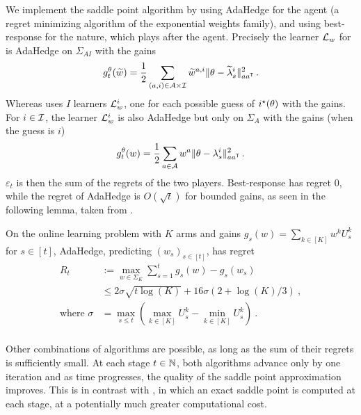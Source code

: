We implement the saddle point algorithm by using AdaHedge for the agent (a regret minimizing algorithm of the exponential weights family), and using best-response for the nature, which plays after the agent. Precisely the learner $\mathcal{L}_w$ for \LGC is AdaHedge on $\Sigma_{AI}$ with the gains
\[
g_t^\theta(\widetilde{w}) = \frac{1}{2} \sum_{(a,i)\in\mathcal{A}\times\mathcal{I}}  \widetilde{w}^{a,i} \Vert \theta - \widetilde{\lambda}_s^i \Vert^2_{a a^{\mathsf{\scriptscriptstyle T}}}\,.
\]
 Whereas \LG uses $I$ learners $\mathcal{L}_w^i$, one for each possible guess of $i^\star(\theta)$ with the gains. For $i\in\mathcal{I}$, the learner $\mathcal{L}_w^i$ is also AdaHedge but only on $\Sigma_A$ with the gains (when the guess is $i$)
 \[
 g_t^\theta(w) = \frac{1}{2} \sum_{a\in\mathcal{A}}  w^{a} \Vert \theta - \lambda_s^i \Vert^2_{a a^{\mathsf{\scriptscriptstyle T}}}\,.
 \]
 $\varepsilon_t$ is then the sum of the regrets of the two players. Best-response has regret 0, while the regret of AdaHedge is $O(\sqrt{t})$ for bounded gains, as seen in the following lemma, taken from \citet{derooij2014hedge}.
\begin{lemma}\label{lem:adahedge}
On the online learning problem with $K$ arms and gains $g_s(w) = \sum_{k\in[K]} w^k  U_s^k$ for $s\in[t]$, AdaHedge, predicting $(w_s)_{s\in[t]}$, has regret
\begin{align*}
R_t&:= \max_{w\in\Sigma_K}\sum_{s=1}^t g_s(w) -g_s(w_s) \\
&\le 2\sigma\sqrt{t\log(K)} + 16\sigma(2+\log(K)/3) \: ,\\
\text{where }
\sigma &= \max_{s\le t}  (\max_{k\in[K]}U_s^{k}- \min_{k\in[K]}U_s^{k}) \:.\\
\end{align*}
\end{lemma}
Other combinations of algorithms are possible, as long as the sum of their regrets is sufficiently small. At each stage $t\in{\mathbb N}$, both algorithms advance only by one iteration and as time progresses, the quality of the saddle point approximation improves. This is in contrast with \Track \cite{garivier2016tracknstop}, in which an exact saddle point is computed at each stage, at a potentially much greater computational cost.

